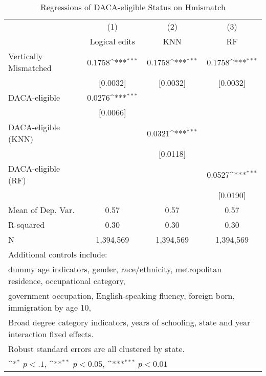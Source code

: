 \begin{table}[htbp]\centering
\def\sym#1{\ifmmode^{#1}\else\(^{#1}\)\fi}
\caption{Regressions of DACA-eligible Status on Hmismatch}
\begin{tabular}{l*{3}{c}}
\toprule
                    &\multicolumn{1}{c}{(1)}         &\multicolumn{1}{c}{(2)}         &\multicolumn{1}{c}{(3)}         \\
                    &Logical edits         &         KNN         &          RF         \\
\midrule
Vertically Mismatched&      0.1758\sym{***}&      0.1758\sym{***}&      0.1758\sym{***}\\
                    &    [0.0032]         &    [0.0032]         &    [0.0032]         \\
\addlinespace
DACA-eligible       &      0.0276\sym{***}&                     &                     \\
                    &    [0.0066]         &                     &                     \\
\addlinespace
DACA-eligible (KNN) &                     &      0.0321\sym{***}&                     \\
                    &                     &    [0.0118]         &                     \\
\addlinespace
DACA-eligible (RF)  &                     &                     &      0.0527\sym{***}\\
                    &                     &                     &    [0.0190]         \\
\midrule
Mean of Dep. Var.   &        0.57         &        0.57         &        0.57         \\
R-squared           &        0.30         &        0.30         &        0.30         \\
N                   &   1,394,569         &   1,394,569         &   1,394,569         \\
\bottomrule
\multicolumn{4}{l}{\footnotesize Additional controls include:}\\
\multicolumn{4}{l}{\footnotesize dummy age indicators, gender, race/ethnicity, metropolitan residence, occupational category,}\\
\multicolumn{4}{l}{\footnotesize government occupation, English-speaking fluency, foreign born, immigration by age 10,}\\
\multicolumn{4}{l}{\footnotesize Broad degree category indicators, years of schooling, state and year interaction fixed effects.}\\
\multicolumn{4}{l}{\footnotesize Robust standard errors are all clustered by state.}\\
\multicolumn{4}{l}{\footnotesize \sym{*} \(p<.1\), \sym{**} \(p<0.05\), \sym{***} \(p<0.01\)}\\
\end{tabular}
\end{table}

